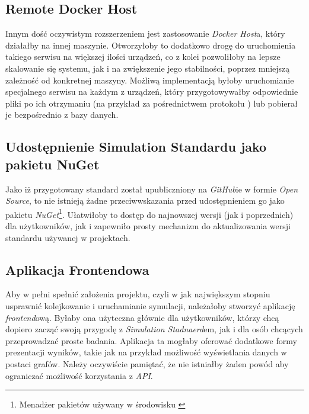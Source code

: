 \subsection{Remote Docker Host}

\par Innym dość oczywistym rozszerzeniem jest zastosowanie \emph{Docker Host}a, który działałby na innej maszynie. Otworzyłoby to dodatkowo drogę do uruchomienia takiego serwisu na większej ilości urządzeń, co z kolei pozwoliłoby na lepsze skalowanie się systemu, jak i na zwiększenie jego stabilności, poprzez mniejszą zależność od konkretnej maszyny. Możliwą implementacją byłoby uruchomianie specjalnego serwisu na każdym z urządzeń, który przygotowywałby odpowiednie pliki po ich otrzymaniu (na przykład za pośrednictwem protokołu \texttt{\https{}}) lub pobierał je bezpośrednio z bazy danych.

\subsection{Udostępnienie Simulation Standardu jako pakietu NuGet}

\par Jako iż przygotowany standard został upubliczniony na \emph{GitHub}ie w formie \emph{Open Source}, to nie istnieją żadne przeciwwskazania przed udostępnieniem go jako pakietu \emph{NuGet}\footnote{Menadżer pakietów używany w środowisku \emph{\dotnet{}}}. Ułatwiłoby to dostęp do najnowszej wersji (jak i poprzednich) dla użytkowników, jak i zapewniło prosty mechanizm do aktualizowania wersji standardu używanej w projektach.

\subsection{Aplikacja Frontendowa}

\par Aby w pełni spełnić założenia projektu, czyli w jak największym stopniu usprawnić kolejkowanie i uruchamianie symulacji, należałoby stworzyć aplikację \emph{frontend}ową. Byłaby ona użyteczna głównie dla użytkowników, którzy chcą dopiero zacząć swoją przygodę z \emph{Simulation Stadnaerd}em, jak i dla osób chcących przeprowadzać proste badania. Aplikacja ta mogłaby oferować dodatkowe formy prezentacji wyników, takie jak na przykład możliwość wyświetlania danych w postaci grafów. Należy oczywiście pamiętać, że nie istniałby żaden powód aby ograniczać możliwość korzystania z \emph{API}.


